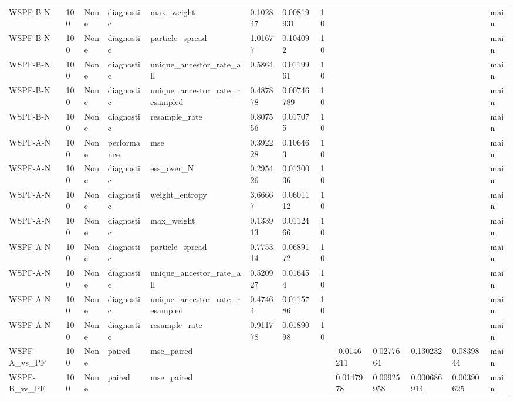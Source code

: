 \begin{tabular}{lllllllllllll}
WSPF-B-N & 100 & None & diagnostic & max\_weight & 0.102847 & 0.00819931 & 10 &  &  &  &  & main \\
WSPF-B-N & 100 & None & diagnostic & particle\_spread & 1.01677 & 0.104092 & 10 &  &  &  &  & main \\
WSPF-B-N & 100 & None & diagnostic & unique\_ancestor\_rate\_all & 0.5864 & 0.0119961 & 10 &  &  &  &  & main \\
WSPF-B-N & 100 & None & diagnostic & unique\_ancestor\_rate\_resampled & 0.487878 & 0.00746789 & 10 &  &  &  &  & main \\
WSPF-B-N & 100 & None & diagnostic & resample\_rate & 0.807556 & 0.017075 & 10 &  &  &  &  & main \\
WSPF-A-N & 100 & None & performance & mse & 0.392228 & 0.106463 & 10 &  &  &  &  & main \\
WSPF-A-N & 100 & None & diagnostic & ess\_over\_N & 0.295426 & 0.0130036 & 10 &  &  &  &  & main \\
WSPF-A-N & 100 & None & diagnostic & weight\_entropy & 3.66667 & 0.0601112 & 10 &  &  &  &  & main \\
WSPF-A-N & 100 & None & diagnostic & max\_weight & 0.133913 & 0.0112466 & 10 &  &  &  &  & main \\
WSPF-A-N & 100 & None & diagnostic & particle\_spread & 0.775314 & 0.0689172 & 10 &  &  &  &  & main \\
WSPF-A-N & 100 & None & diagnostic & unique\_ancestor\_rate\_all & 0.520927 & 0.016454 & 10 &  &  &  &  & main \\
WSPF-A-N & 100 & None & diagnostic & unique\_ancestor\_rate\_resampled & 0.47464 & 0.0115786 & 10 &  &  &  &  & main \\
WSPF-A-N & 100 & None & diagnostic & resample\_rate & 0.911778 & 0.0189098 & 10 &  &  &  &  & main \\
WSPF-A\_vs\_PF & 100 & None & paired & mse\_paired &  &  &  & -0.0146211 & 0.0277664 & 0.130232 & 0.0839844 & main \\
WSPF-B\_vs\_PF & 100 & None & paired & mse\_paired &  &  &  & 0.0147978 & 0.00925958 & 0.000686914 & 0.00390625 & main \\
\hline
\end{tabular}
